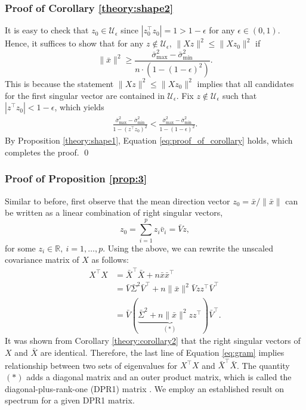 \documentclass[11pt]{article}
\newcommand{\calU}{\mathcal{U}}
\newcommand{\bbR}{\mathbb{R}}
\begin{document}
\subsubsection*{Proof of Corollary \ref{theory:shape2}}

It is easy to check that $z_0 \in \calU_{\epsilon}$ since $|z_0^\top z_0| = 1 > 1-\epsilon$ for any $\epsilon \in (0,1)$. Hence, it suffices to show that for any $z \notin \calU_{\epsilon}$, $\|Xz\|^2 \leq \|Xz_0\|^2$ if 
\begin{equation}\label{eq:proof_of_corollary}
	\|\bar{x}\|^2 \geq \frac{\bar{\sigma}_{\max}^2 - \bar{\sigma}_{\min}^2}{n\cdot \left(1 - (1-\epsilon)^2\right)}.
\end{equation}
This is because the statement $\|Xz\|^2 \leq \|Xz_0\|^2$ implies that all candidates for the first singular vector are contained in $\calU_{\epsilon}$. Fix $z \notin \calU_{\epsilon}$ such that $|z^\top z_0| < 1-\epsilon$, which yields 
\begin{eqnarray*}
\frac{\bar{\sigma}_{\max}^2 - \bar{\sigma}_{\min}^2}{1 - (z^\top z_0)^2}	 < \frac{\bar{\sigma}_{\max}^2 - \bar{\sigma}_{\min}^2}{1 - (1-\epsilon)^2}.
\end{eqnarray*}
By Proposition \ref{theory:shape1}, Equation \eqref{eq:proof_of_corollary} holds, which completes the proof. \qed



\subsubsection*{Proof of Proposition \ref{prop:3}}
Similar to before, first observe that the mean direction vector $z_0 = \bar{x}/\|\bar{x}\|$ can be written as a linear combination of right singular vectors, 
\begin{equation*}
	z_0 = \sum_{i=1}^p z_i \bar{v}_i = \bar{V} z,
\end{equation*}
for some $z_i \in \bbR,~i=1,\ldots,p$. Using the above, we can rewrite the unscaled covariance matrix of $X$ as follows:
\begin{equation}\label{eq:gram}
\begin{aligned}
	X^\top X &= \bar{X}^\top \bar{X} + n \bar{x} \bar{x}^\top \\
	&= \bar{V} \bar{\Sigma}^2 \bar{V}^\top + n \|\bar{x}\|^2 \bar{V} z z^\top \bar{V}^\top\\
	&= \bar{V} (
 \underbrace{\bar{\Sigma}^2 + n \|\bar{x}\|^2 zz^\top}_{(*)}	
	)\bar{V}^\top.
\end{aligned}
\end{equation}
It was shown from Corollary \ref{theory:corollary2} that the right singular vectors of $X$ and $\bar{X}$ are identical. Therefore, the last line of Equation \eqref{eq:gram} implies relationship between two sets of eigenvalues for $X^\top X$ and $\bar{X}^\top\bar{X}$. The quantity $(*)$ adds a diagonal matrix and an outer product matrix, which is called the diagonal-plus-rank-one (DPR1) matrix \citep{DPR1}. We employ an established result on spectrum for a given DPR1 matrix.
\end{document}
